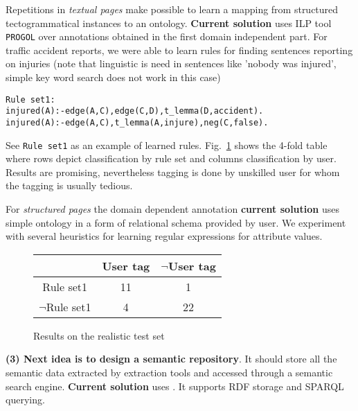 \documentclass{sig-alternate}
\begin{document}
Repetitions in \emph{textual pages} make possible to learn a mapping from structured tectogrammatical instances to an ontology. %
{\bf Current solution} uses ILP tool \texttt{PROGOL} over annotations obtained in the first domain independent part.
For traffic accident reports, we were able to learn rules for finding sentences reporting on injuries (note that linguistic is need in sentences like 'nobody was injured', simple key word search does not work in this case) 

\noindent\texttt{Rule set1:\\
injured(A):-edge(A,C),edge(C,D),t\_lemma(D,accident).\\
injured(A):-edge(A,C),t\_lemma(A,injure),neg(C,false).}

See \texttt{Rule set1} as an example of learned rules. Fig.~\ref{fig:results} shows the 4-fold table where rows depict classification by rule set and columns classification by user. Results are promising, nevertheless tagging is done by unskilled user for whom the tagging is usually tedious.

For \emph{structured pages} the domain dependent annotation \textbf{current solution} uses simple ontology in a form of relational schema provided by user. We experiment with several heuristics for learning regular expressions for attribute values.

\begin{figure}
\label{fig:results}
\centering
\begin{tabular}{|c|c|c|} \hline
 		&User tag	&$\neg$User	tag\\ \hline
Rule set1		& 11&1 \\ \hline
$\neg$Rule set1	& 4 &22\\ \hline
\end{tabular}
\caption{Results on the realistic test set}
\end{figure}


\textbf{(3) Next idea is to design a semantic repository}. It should store all the semantic data extracted by extraction tools and accessed through a semantic search engine. 
{\bf Current solution} uses \cite{biblio:DoTySemanticWeb2007}. It supports RDF storage and SPARQL querying.
\end{document}
